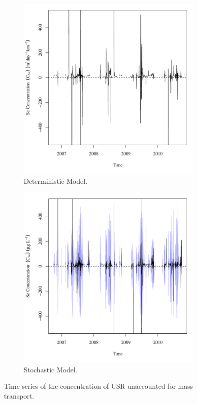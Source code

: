 \begin{linenumbers}
\begin{figure}[htbp]
\centering
	\begin{subfigure}{0.5\textwidth}
		\centering
		\includegraphics[width=0.9\linewidth]{"Figures/Results_DUSR/Balance C"}
		\caption{Deterministic Model.}
	\end{subfigure}%
	\begin{subfigure}{0.5\textwidth}
		\centering
		\includegraphics[width=0.9\linewidth]{"Figures/Results_USR/Balance C"}
		\caption{Stochastic Model.}
	\end{subfigure}
	\caption[Time series of the concentration of USR unaccounted for mass transport.]{Time series of the concentration of USR unaccounted for mass transport.}
	\label{fig:USRC}
\end{figure}


\end{linenumbers}
